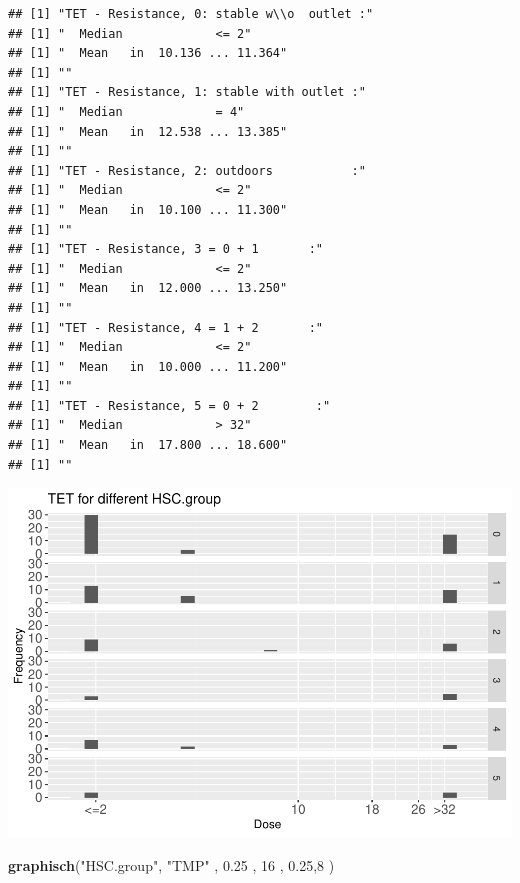 \documentclass[
]{article}
\newenvironment{Shaded}{\begin{snugshade}}{\end{snugshade}}
\newcommand{\DecValTok}[1]{\textcolor[rgb]{0.00,0.00,0.81}{#1}}
\newcommand{\FloatTok}[1]{\textcolor[rgb]{0.00,0.00,0.81}{#1}}
\newcommand{\KeywordTok}[1]{\textcolor[rgb]{0.13,0.29,0.53}{\textbf{#1}}}
\newcommand{\NormalTok}[1]{#1}
\newcommand{\StringTok}[1]{\textcolor[rgb]{0.31,0.60,0.02}{#1}}
\begin{document}
\begin{verbatim}
## [1] "TET - Resistance, 0: stable w\\o  outlet :"
## [1] "  Median             <= 2"
## [1] "  Mean   in  10.136 ... 11.364"
## [1] ""
## [1] "TET - Resistance, 1: stable with outlet :"
## [1] "  Median             = 4"
## [1] "  Mean   in  12.538 ... 13.385"
## [1] ""
## [1] "TET - Resistance, 2: outdoors           :"
## [1] "  Median             <= 2"
## [1] "  Mean   in  10.100 ... 11.300"
## [1] ""
## [1] "TET - Resistance, 3 = 0 + 1       :"
## [1] "  Median             <= 2"
## [1] "  Mean   in  12.000 ... 13.250"
## [1] ""
## [1] "TET - Resistance, 4 = 1 + 2       :"
## [1] "  Median             <= 2"
## [1] "  Mean   in  10.000 ... 11.200"
## [1] ""
## [1] "TET - Resistance, 5 = 0 + 2        :"
## [1] "  Median             > 32"
## [1] "  Mean   in  17.800 ... 18.600"
## [1] ""
\end{verbatim}

\includegraphics{Verteilungen_files/figure-latex/unnamed-chunk-54-1.pdf}

\begin{Shaded}
\begin{Highlighting}[]
   \KeywordTok{graphisch}\NormalTok{(}\StringTok{"HSC.group"}\NormalTok{, }\StringTok{"TMP"}\NormalTok{ , }\FloatTok{0.25}\NormalTok{ ,  }\DecValTok{16}\NormalTok{   ,   }\FloatTok{0.25}\NormalTok{,}\DecValTok{8}\NormalTok{    ) }
\end{Highlighting}
\end{Shaded}
\end{document}
